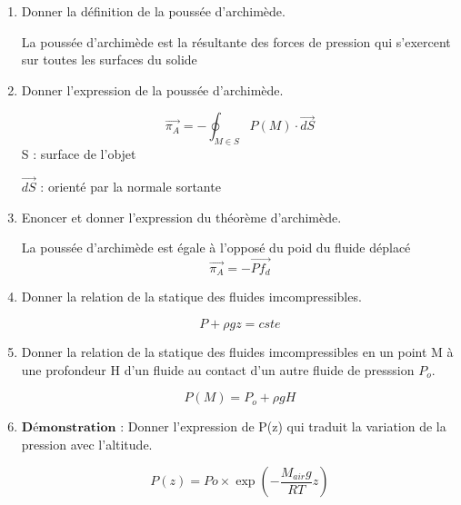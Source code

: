 \begin{enumerate}[label=\arabic{enumi} - , left=0pt, itemsep=1em]
\begin{solution}
           \end{solution}
     
    \item Donner la définition de la poussée d'archimède. \par
    \begin{solution}
        La poussée d'archimède est la résultante des forces de pression qui s'exercent sur toutes les surfaces du solide 
     \end{solution}

     \item Donner l'expression de la poussée d'archimède. \par
     \begin{solution}
         \[ \vec{\pi_A} = -\oint_{M \in S} P(M) \cdot \vec{dS} \]
          \tiny  S : surface de l'objet \par
          \tiny   $\vec{dS}$ : orienté par la normale sortante  
      \end{solution}

      \item Enoncer et donner l'expression du théorème d'archimède. \par
      \begin{solution}
          La poussée d'archimède est égale à l'opposé du poid du fluide déplacé
          \[\vec{\pi_A} = - \overrightarrow{Pf_d} \] 
       \end{solution}

       \item Donner la relation de la statique des fluides imcompressibles. \par
       \begin{solution}
          \[ P + \rho g z = cste\]
        \end{solution}

        \item Donner la relation de la statique des fluides imcompressibles en un point M à une profondeur H d'un fluide au contact d'un autre fluide de presssion $P_o$. \par
        \begin{solution}
           \[P(M) = P_o + \rho g H\]
           
         \end{solution}

         \item $\textbf{Démonstration :}$ Donner l'expression de P(z) qui traduit la variation de la pression avec l'altitude.\par
         \begin{solution}
            \[P(z) = Po \times \exp(- \frac{M_{air}g}{RT}z) \]
            

\end{solution}
\end{enumerate}
